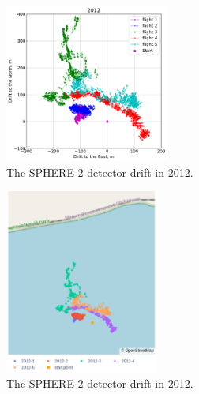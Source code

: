 \documentclass[final,5p,times,twocolumn]{elsarticle}
\begin{document}
\begin{figure}[tb]
    \includegraphics[width=0.48\textwidth]{figs/2012_drift.pdf}
    \caption{The SPHERE-2 detector drift in 2012.}
    \label{fig:2012-drift}
\end{figure}
\begin{figure}[tb]
    \includegraphics[width=0.45\textwidth]{figs/newplot2.pdf}
    \caption{The SPHERE-2 detector drift in 2012.}
\end{figure}
\end{document}
